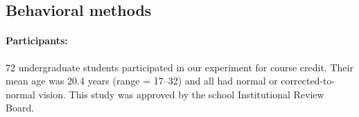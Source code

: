 \documentclass{article}
\begin{document}
\subsection{Behavioral methods}

\paragraph{Participants:}
72 undergraduate students participated in our experiment for course credit. Their mean age was 20.4 years (range = 17–32) and all had normal or corrected-to-normal vision. This study was approved by the school Institutional Review Board. 

\end{document}
